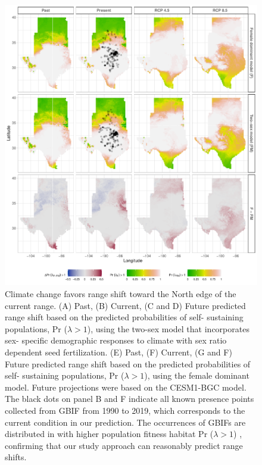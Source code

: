 \documentclass[12pt]{article}\usepackage[]{graphicx}\usepackage[dvipsnames]{xcolor}
\begin{document}
\begin{figure}[H]
	\begin{center}
		\includegraphics[width=0.95\linewidth]{Figures/Fig_geoPrlambda_ces.pdf}
		\caption{Climate change favors range shift toward the North edge of the current range.
			(A) Past, (B) Current, (C and D) Future predicted range shift based on the predicted probabilities of self- sustaining populations, Pr ($\lambda > 1$), using the two-sex model that incorporates sex- specific demographic responses to climate with sex ratio dependent seed fertilization.
			(E) Past, (F) Current, (G and F) Future  predicted range shift based on the predicted probabilities of self- sustaining populations, Pr ($\lambda > 1$), using the female dominant model.
			Future projections were based on the CESM1-BGC model.
			The black dots on panel B and F indicate all known presence points collected from GBIF from 1990 to 2019, which corresponds to the current condition in our prediction. 
			The occurrences of GBIFs are distributed in with higher population fitness habitat Pr ($\lambda > 1$) , confirming that our study approach can reasonably predict range shifts. }
		\label{Sup:geoprojces}
	\end{center}
\end{figure}
\end{document}
